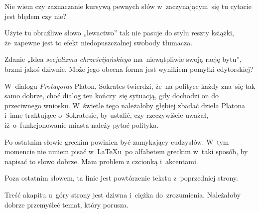 \documentclass[a4paper,11pt]{article}
\begin{document}
\noindent
{} Nie wiem czy zaznaczanie kursywą pewnych słów
w~zaczynającym~się tu cytacie jest błędem czy nie?

\vspace{\spaceFour}





\noindent
{} Użyte tu obraźliwe słowo „lewactwo” tak nie pasuje do stylu
reszty książki, że~zapewne jest to efekt niedopuszczalnej swobody tłumacza.

\vspace{\spaceFour}





\noindent
{} Zdanie „Idea \textit{socjalizmu chrześcijańskiego}
ma~niewątpliwie swoją rację bytu”, brzmi jakoś dziwnie. Może jego obecna
forma jest wynikiem pomyłki edytorskiej?

\vspace{\spaceFour}





\noindent
{} W~dialogu \textit{Protagoras} Platon, Sokrates twierdzi,
że~na polityce każdy zna~się tak samo dobrze, choć dialog ten kończy~się
sytuacją, gdy dochodzi on do przeciwnego wniosku. W~świetle tego należałoby
głębiej zbadać dzieła Platona i~inne traktujące o~Sokratesie, by ustalić,
czy rzeczywiście uważał, iż~o~funkcjonowanie miasta należy pytać polityka.

\vspace{\spaceFour}





\noindent
{} Po ostatnim słowie greckim powinien być zamykający
cudzysłów. W~tym momencie nie umiem pisać w~\LaTeX u~po alfabetem greckim
w~taki sposób, by napisać to słowo dobrze. Mam problem z czcionką
i~akcentami.

\vspace{\spaceFour}





\noindent
{} Poza ostatnim słowem, ta linie jest powtórzenie tekstu
z~poprzedniej strony.

\vspace{\spaceFour}





\noindent
{} Treść akapitu u~góry strony jest dziwna i~ciężka do~zrozumienia.
Należałoby dobrze przemyśleć temat, który porusza.
\end{document}
